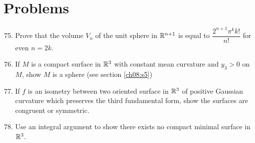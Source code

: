 \documentclass[../main]{subfiles}
\begin{document}
\section*{Problems}
\begin{enumerate}
\setcounter{enumi}{74}
\item\label{pro:75}
Prove that the volume $V_n$ of the unit sphere in $\mathbb{R}^{n+1}$ is equal to $\dfrac{2^{n+1}\pi^kk!}{n!}$ for even $n=2k$.

\item\label{pro:76}
If $M$ is a compact surface in $\mathbb{R}^3$ with constant mean curvature and $y_3>0$ on $M$, show $M$ is a sphere (see section \ref{ch08:s5})

\item\label{pro:77}
If $f$ is an isometry between two oriented surface in $\mathbb{R}^3$ of positive Gaussian curvature which preserves the third fundamental form, show the surfaces are congruent or symmetric.

\item\label{pro:78}
Use an integral argument to show there exists no compact minimal surface in $\mathbb{R}^3$.

\end{enumerate}
\end{document}
